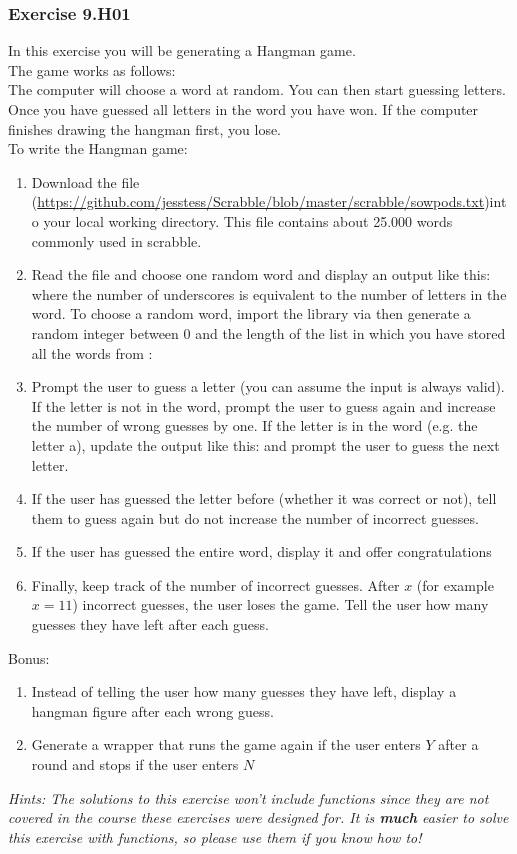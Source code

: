 \subsubsection*{Exercise 9.H01}
In this exercise you will be generating a Hangman game.\\
The game works as follows:\\
The computer will choose a word at random. You can then start guessing letters. Once you
have guessed all letters in the word you have won. If the computer finishes drawing the
hangman first, you lose.\\
To write the Hangman game:\\
\begin{enumerate}
	\item Download the file {} (\url{https://github.com/jesstess/Scrabble/blob/master/scrabble/sowpods.txt})into your local working directory. This file contains about 25.000 words commonly used in scrabble.
	\item Read the file and choose one random word and display an output like this:
{} where the number of underscores is equivalent to the number of letters in the word. To choose a random word, import the {} library via {} then generate a random integer between 0 and the length of the list {} in which you have stored all the words from {}:
{}
	\item Prompt the user to guess a letter (you can assume the input is always valid). If the
letter is not in the word, prompt the user to guess again and increase the number of
wrong guesses by one. If the letter is in the word (e.g. the letter a), update the output
like this: {} and prompt the user to guess the next letter.
	\item If the user has guessed the letter before (whether it was correct or not), tell them to guess again but do not increase the number of incorrect guesses.
	\item If the user has guessed the entire word, display it and offer congratulations
	\item Finally, keep track of the number of incorrect guesses. After $x$ (for example $x=11$) incorrect guesses, the user loses the game. Tell the user how many guesses they have
left after each guess.
\end{enumerate}
Bonus:
\begin{enumerate}
	\item Instead of telling the user how many guesses they have left, display a hangman figure after each wrong guess.
	\item Generate a wrapper that runs the game again if the user enters $Y$ after a round and
stops if the user enters $N$
\end{enumerate}

\textit{Hints:
The solutions to this exercise won't include functions since they are not covered in the course these exercises were designed for. It is \textbf{much} easier to solve this exercise with functions, so please use them if you know how to!}






